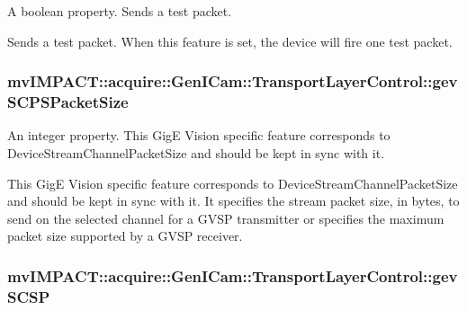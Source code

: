 A boolean property. Sends a test packet. 

Sends a test packet. When this feature is set, the device will fire one test packet. \hypertarget{classmv_i_m_p_a_c_t_1_1acquire_1_1_gen_i_cam_1_1_transport_layer_control_a9aaa69a850d9a3a92fd5d59ef48239af}{
\subsubsection[{gev\+S\+C\+P\+S\+Packet\+Size}]{ mv\+I\+M\+P\+A\+C\+T\+::acquire\+::\+Gen\+I\+Cam\+::\+Transport\+Layer\+Control\+::gev\+S\+C\+P\+S\+Packet\+Size}}\label{classmv_i_m_p_a_c_t_1_1acquire_1_1_gen_i_cam_1_1_transport_layer_control_a9aaa69a850d9a3a92fd5d59ef48239af}


An integer property. This Gig\+E Vision specific feature corresponds to Device\+Stream\+Channel\+Packet\+Size and should be kept in sync with it. 

This Gig\+E Vision specific feature corresponds to Device\+Stream\+Channel\+Packet\+Size and should be kept in sync with it. It specifies the stream packet size, in bytes, to send on the selected channel for a G\+V\+S\+P transmitter or specifies the maximum packet size supported by a G\+V\+S\+P receiver. \hypertarget{classmv_i_m_p_a_c_t_1_1acquire_1_1_gen_i_cam_1_1_transport_layer_control_af936593b12edc0f7b88b108044502eff}{
\subsubsection[{gev\+S\+C\+S\+P}]{ mv\+I\+M\+P\+A\+C\+T\+::acquire\+::\+Gen\+I\+Cam\+::\+Transport\+Layer\+Control\+::gev\+S\+C\+S\+P}}\label{classmv_i_m_p_a_c_t_1_1acquire_1_1_gen_i_cam_1_1_transport_layer_control_af936593b12edc0f7b88b108044502eff}


